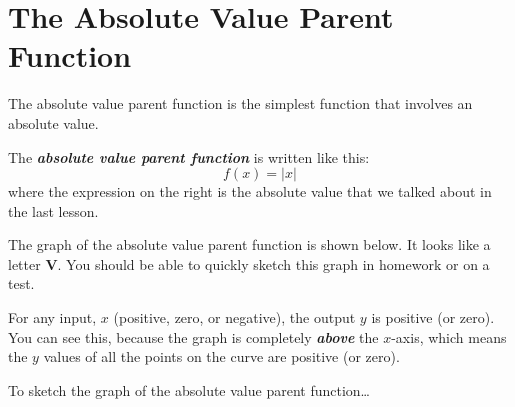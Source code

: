 

\section*{The Absolute Value Parent Function}

The absolute value parent function is the simplest function that involves an absolute value.

\begin{center}
    \begin{tcolorbox}
        The {\bfseries\itshape absolute value parent function} is written like this:
        \[
            f(x) = |x|
        \]
        where the expression on the right is the absolute value that we talked about 
        in the last lesson.
    \end{tcolorbox}
\end{center}








The graph of the absolute value parent function is shown below.
It looks like a letter {\sffamily\bfseries V}.
You should be able to quickly sketch this graph in homework or on a test.

\begin{center}
\end{center}

For any input, $x$ (positive, zero, or negative), the output $y$ is positive (or zero). 
You can see this, because the graph is completely {\bfseries\itshape above} the $x$-axis,
which means the $y$ values of all the points on the curve are positive (or zero).

\begin{myConceptSteps}{To sketch the graph of the absolute value parent function\dots}
\end{myConceptSteps}


